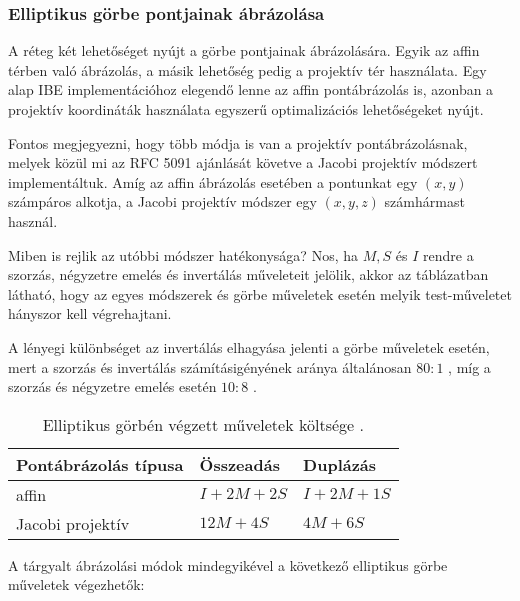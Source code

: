 \subsubsection{Elliptikus görbe pontjainak ábrázolása}

A réteg két lehetőséget nyújt a görbe pontjainak ábrázolására. Egyik az affin térben való ábrázolás, a másik lehetőség pedig a projektív tér használata. Egy alap IBE implementációhoz elegendő lenne az affin pontábrázolás is, azonban a projektív koordináták használata egyszerű optimalizációs lehetőségeket nyújt.

Fontos megjegyezni, hogy több módja is van a projektív pontábrázolásnak, melyek közül mi az RFC 5091 ajánlását követve a Jacobi projektív módszert implementáltuk. Amíg az affin ábrázolás esetében a pontunkat egy $(x, y)$ számpáros alkotja, a Jacobi projektív módszer egy $(x, y, z)$ számhármast használ.

Miben is rejlik az utóbbi módszer hatékonysága? Nos, ha $M, S$ és $I$ rendre a szorzás, négyzetre emelés és invertálás műveleteit jelölik, akkor az  táblázatban látható, hogy az egyes módszerek és görbe műveletek esetén melyik test-műveletet hányszor kell végrehajtani.

A lényegi különbséget az invertálás elhagyása jelenti a görbe műveletek esetén, mert a szorzás és invertálás számításigényének aránya általánosan $80 : 1$ \cite{Nyakacska::ECC-PBC}, míg a szorzás és négyzetre emelés esetén $10 : 8$ \cite{BernsteinLange::ECC}.

\begin{table}[H]
    \centering
    \begin{tabular}{|l|l|l|}
    \hline
    \textbf{Pontábrázolás típusa} & \textbf{Összeadás} & \textbf{Duplázás} \\ \hline
    affin                         & $I + 2M + 2S$      & $I + 2M + 1S$     \\ \hline
    Jacobi projektív              & $12M + 4S$         & $4M + 6S$         \\ \hline
    \end{tabular}
    \caption{Elliptikus görbén végzett műveletek költsége \protect\cite{Martin::IntroductionToIdentityBasedEncryption}.}
    \label{table::OperationCost}
\end{table}

A tárgyalt ábrázolási módok mindegyikével a következő elliptikus görbe műveletek végezhetők:

